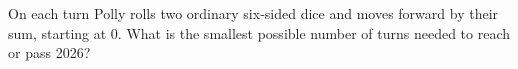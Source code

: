 On each turn Polly rolls two ordinary six-sided dice and moves forward by their sum, starting at 0. What is the smallest possible number of turns needed to reach or pass 2026?
